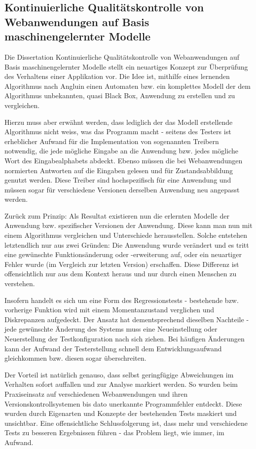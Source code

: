 \subsection{Kontinuierliche Qualitätskontrolle von Webanwendungen auf Basis 
maschinengelernter Modelle}\label{ssection:windmueller}


Die \glqq{}Dissertation Kontinuierliche Qualitätskontrolle von Webanwendungen auf 
Basis maschinengelernter Modelle\grqq{} \cite{diss:windmueller} stellt ein neuartiges Konzept
zur Überprüfung des Verhaltens einer Applikation vor. Die Idee ist, mithilfe eines
lernenden Algorithmus nach Angluin \cite{angluin} einen Automaten bzw. ein komplettes Modell
der dem Algorithmus unbekannten, quasi \glqq{}Black Box\grqq{}, Anwendung zu erstellen und zu vergleichen.

Hierzu muss aber erwähnt werden, dass lediglich der das Modell erstellende Algorithmus nicht
weiss, was das Programm macht - seitens des Testers ist erheblicher Aufwand für die Implementation
von sogenannten Treibern notwendig, die jede mögliche Eingabe an die Anwendung bzw. jedes
mögliche Wort des Eingabealphabets abdeckt. Ebenso müssen die bei Webanwendungen normierten
Antworten auf die Eingaben gelesen und für Zustandsabbildung genutzt werden. Diese Treiber
sind hochspezifisch für eine Anwendung und müssen sogar für verschiedene Versionen derselben
Anwendung neu angepasst werden.

Zurück zum Prinzip: Als Resultat existieren nun die erlernten Modelle der Anwendung bzw. spezifischer
Versionen der Anwendung. Diese kann man nun mit einem Algorithmus vergleichen und Unterschiede
herausstellen. Solche entstehen letztendlich nur aus zwei Gründen: Die Anwendung wurde verändert
und es tritt eine gewünschte Funktionsänderung oder -erweiterung auf, oder ein neuartiger Fehler
wurde (im Vergleich zur letzten Version) erschaffen. Diese Differenz ist offensichtlich nur
aus dem Kontext heraus und nur durch einen Menschen zu verstehen.

Insofern handelt es sich um eine Form des Regressionstests \cite{regression} - bestehende bzw.
vorherige Funktion wird mit einem Momentanzustand verglichen und Diskrepanzen aufgedeckt. Der
Ansatz hat dementsprechend dieselben Nachteile - jede gewünschte Änderung des Systems muss eine
Neueinstellung oder Neuerstellung der Testkonfiguration nach sich ziehen. Bei häufigen
Änderungen kann der Aufwand der Testerstellung schnell dem Entwicklungsaufwand gleichkommen bzw.
diesen sogar überschreiten.

Der Vorteil ist natürlich genauso, dass selbst geringfügige Abweichungen im Verhalten sofort
auffallen und zur Analyse markiert werden. So wurden beim Praxiseinsatz auf verschiedenen
Webanwendungen und ihren Versionskontrollsystemen bis dato unerkannte Programmfehler entdeckt.
Diese wurden durch Eigenarten und Konzepte der bestehenden Tests maskiert und unsichtbar.
Eine offensichtliche Schlussfolgerung ist, dass mehr und verschiedene Tests zu besseren
Ergebnissen führen - das Problem liegt, wie immer, im Aufwand.

